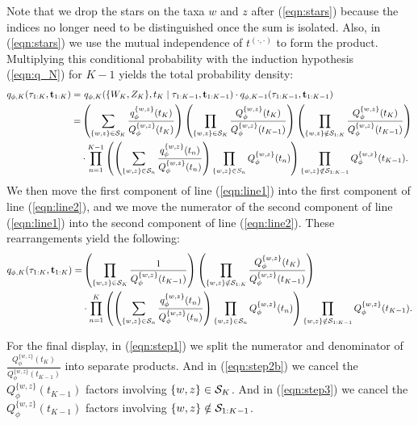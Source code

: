 \begin{doublespace}
Note that we drop the stars on the taxa $w$ and $z$ after (\ref{eqn:stars}) because the indices no longer need to be distinguished once the sum is isolated. Also, in (\ref{eqn:stars}) we use the mutual independence of $t^{(\cdot,\cdot)}$ to form the product. Multiplying this conditional probability with the induction hypothesis (\ref{eqn:q_N}) for $K-1$ yields the total probability density:
\begin{align}
    q_{\phi,K}(\tau_{1:K},\mathbf{t}_{1:K}) =&\ q_{\phi,K}(\{W_K,Z_K\},t_{K} \mid \tau_{1:K-1},\mathbf{t}_{1:K-1}) \cdot q_{\phi,K-1}(\tau_{1:K-1},\mathbf{t}_{1:K-1}) \\
    =& \left(\sum_{\{w,z\} \in \mathcal{S}_K} \frac{q_\phi^{\{w,z\}}(t_{K})}{Q_\phi^{\{w,z\}}(t_{K})}\right)
    \left(\prod_{\{w,z\} \in \mathcal{S}_K} \frac{Q_\phi^{\{w,z\}}(t_{K})}{Q_\phi^{\{w,z\}}(t_{K-1})}\right)
    \left(\prod_{\{w,z\} \notin \mathcal{S}_{1:K}} \frac{Q_\phi^{\{w,z\}}(t_{K})}{Q_\phi^{\{w,z\}}(t_{K-1})}\right)\label{eqn:line1} \\
    & \cdot \prod_{n=1}^{K-1} \left(\left(\sum_{\{w,z\} \in \mathcal{S}_n } \frac{q_\phi^{\{w,z\}}(t_n)}{Q_\phi^{\{w,z\}}(t_n)} \right) \prod_{\{w,z\} \in S_n} Q_\phi^{\{w,z\}}(t_n)\right)
    \prod_{\{w,z\} \notin \mathcal{S}_{1:K-1}} Q_\phi^{\{w,z\}}(t_{K-1}). \label{eqn:line2}
\end{align}
%
We then move the first component of line (\ref{eqn:line1}) into the first component of line (\ref{eqn:line2}), and we move the numerator of the second component of line (\ref{eqn:line1}) into the second component of line (\ref{eqn:line2}). These rearrangements yield the following:
%
\begin{align}
    q_{\phi,K}(\tau_{1:K},\mathbf{t}_{1:K}) =& \left(\prod_{\{w,z\} \in \mathcal{S}_K} \frac{1}{Q_\phi^{\{w,z\}}(t_{K-1})}\right)
    \left(\prod_{\{w,z\} \notin \mathcal{S}_{1:K}} \frac{Q_\phi^{\{w,z\}}(t_{K})}{Q_\phi^{\{w,z\}}(t_{K-1})}\right)  \nonumber \\
    & \cdot \prod_{n=1}^{K} \left(\left(\sum_{\{w,z\} \in \mathcal{S}_n} \frac{q_\phi^{\{w,z\}}(t_n)}{Q_\phi^{\{w,z\}}(t_n)}\right)\prod_{\{w,z\} \in \mathcal{S}_n} Q_\phi^{\{w,z\}}(t_n)\right)
    \prod_{\{w,z\} \notin \mathcal{S}_{1:K-1}} Q_\phi^{\{w,z\}}(t_{K-1}).
\end{align}


For the final display, in (\ref{eqn:step1}) we split the numerator and denominator of $\frac{Q_\phi^{\{w,z\}}(t_{K})}{Q_\phi^{\{w,z\}}(t_{K-1})}$ into separate products. And in (\ref{eqn:step2b}) we cancel the  $Q_\phi^{\{w,z\}}(t_{K-1})$ factors involving $\{w,z\} \in \mathcal{S}_{K}$. And in (\ref{eqn:step3}) we cancel the $Q_\phi^{\{w,z\}}(t_{K-1})$ factors involving $\{w,z\} \notin \mathcal{S}_{1:K-1}$.


\end{doublespace}
